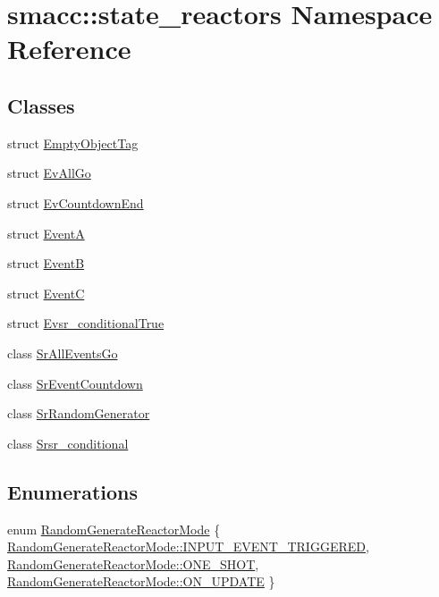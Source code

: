 \hypertarget{namespacesmacc_1_1state__reactors}{}\section{smacc\+:\+:state\+\_\+reactors Namespace Reference}
\label{namespacesmacc_1_1state__reactors}
\subsection*{Classes}
\begin{DoxyCompactItemize}
\item 
struct \hyperlink{structsmacc_1_1state__reactors_1_1EmptyObjectTag}{Empty\+Object\+Tag}
\item 
struct \hyperlink{structsmacc_1_1state__reactors_1_1EvAllGo}{Ev\+All\+Go}
\item 
struct \hyperlink{structsmacc_1_1state__reactors_1_1EvCountdownEnd}{Ev\+Countdown\+End}
\item 
struct \hyperlink{structsmacc_1_1state__reactors_1_1EventA}{EventA}
\item 
struct \hyperlink{structsmacc_1_1state__reactors_1_1EventB}{EventB}
\item 
struct \hyperlink{structsmacc_1_1state__reactors_1_1EventC}{EventC}
\item 
struct \hyperlink{structsmacc_1_1state__reactors_1_1Evsr__conditionalTrue}{Evsr\+\_\+conditional\+True}
\item 
class \hyperlink{classsmacc_1_1state__reactors_1_1SrAllEventsGo}{Sr\+All\+Events\+Go}
\item 
class \hyperlink{classsmacc_1_1state__reactors_1_1SrEventCountdown}{Sr\+Event\+Countdown}
\item 
class \hyperlink{classsmacc_1_1state__reactors_1_1SrRandomGenerator}{Sr\+Random\+Generator}
\item 
class \hyperlink{classsmacc_1_1state__reactors_1_1Srsr__conditional}{Srsr\+\_\+conditional}
\end{DoxyCompactItemize}
\subsection*{Enumerations}
\begin{DoxyCompactItemize}
\item 
enum \hyperlink{namespacesmacc_1_1state__reactors_a038f8e362ad6d35494c940ee4c97a52e}{Random\+Generate\+Reactor\+Mode} \{ \hyperlink{namespacesmacc_1_1state__reactors_a038f8e362ad6d35494c940ee4c97a52eab75323a08fc093fa69e7a6aceb681611}{Random\+Generate\+Reactor\+Mode\+::\+I\+N\+P\+U\+T\+\_\+\+E\+V\+E\+N\+T\+\_\+\+T\+R\+I\+G\+G\+E\+R\+ED}, 
\hyperlink{namespacesmacc_1_1state__reactors_a038f8e362ad6d35494c940ee4c97a52ea5bc2964599423c796ecf0aaecdc5be9d}{Random\+Generate\+Reactor\+Mode\+::\+O\+N\+E\+\_\+\+S\+H\+OT}, 
\hyperlink{namespacesmacc_1_1state__reactors_a038f8e362ad6d35494c940ee4c97a52ea4a6be4c8602d150038b100a35556d3d7}{Random\+Generate\+Reactor\+Mode\+::\+O\+N\+\_\+\+U\+P\+D\+A\+TE}
 \}
\end{DoxyCompactItemize}


